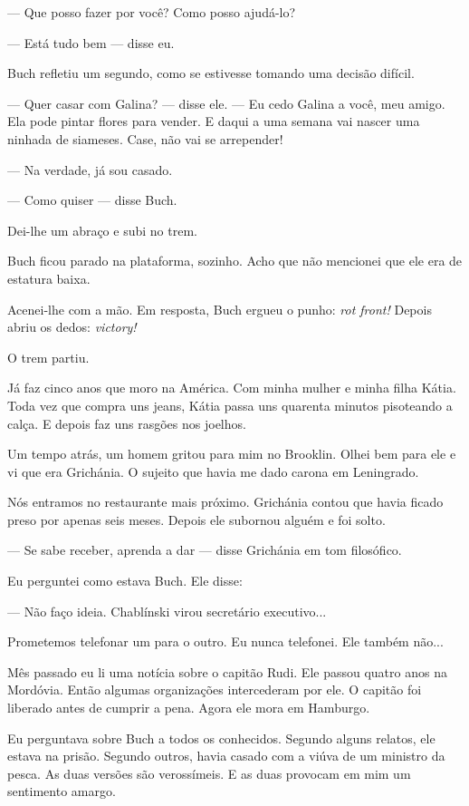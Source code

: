 --- Que posso fazer por você? Como posso ajudá-lo?

--- Está tudo bem --- disse eu.

Buch refletiu um segundo, como se estivesse tomando uma decisão difícil.

--- Quer casar com Galina? --- disse ele. --- Eu cedo Galina a você, meu
amigo. Ela pode pintar flores para vender. E daqui a uma semana vai
nascer uma ninhada de siameses. Case, não vai se arrepender!

--- Na verdade, já sou casado.

--- Como quiser --- disse Buch.

Dei-lhe um abraço e subi no trem.

Buch ficou parado na plataforma, sozinho. Acho que não mencionei que ele
era de estatura baixa.

Acenei-lhe com a mão. Em resposta, Buch ergueu o punho: \emph{rot
front!} Depois abriu os dedos: \emph{victory!}

O trem partiu.

Já faz cinco anos que moro na América. Com minha mulher e minha filha
Kátia. Toda vez que compra uns jeans, Kátia passa uns quarenta minutos
pisoteando a calça. E depois faz uns rasgões nos joelhos.

Um tempo atrás, um homem gritou para mim no Brooklin. Olhei bem para ele
e vi que era Grichánia. O sujeito que havia me dado carona em
Leningrado.

Nós entramos no restaurante mais próximo. Grichánia contou que havia
ficado preso por apenas seis meses. Depois ele subornou alguém e foi
solto.

--- Se sabe receber, aprenda a dar --- disse Grichánia em tom
filosófico.

Eu perguntei como estava Buch. Ele disse:

--- Não faço ideia. Chablínski virou secretário executivo...

Prometemos telefonar um para o outro. Eu nunca telefonei. Ele também
não...

Mês passado eu li uma notícia sobre o capitão Rudi. Ele passou quatro
anos na Mordóvia. Então algumas organizações intercederam por ele. O
capitão foi liberado antes de cumprir a pena. Agora ele mora em
Hamburgo.

Eu perguntava sobre Buch a todos os conhecidos. Segundo alguns relatos,
ele estava na prisão. Segundo outros, havia casado com a viúva de um
ministro da pesca. As duas versões são verossímeis. E as duas provocam
em mim um sentimento amargo.

